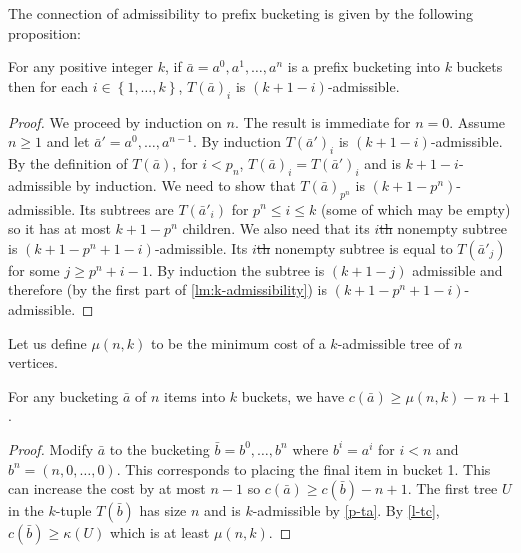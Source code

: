 \documentclass[unicode,review]{siamart1116}
\newcommand{\natInt}[2]{ \left\{ #1, \dotsc, #2 \right\} }
\numberwithin{theorem}{section}
\providecommand{\DIFadd}[1]{{\protect\color{blue}\uwave{#1}}} %
\providecommand{\DIFdel}[1]{{\protect\color{red}\sout{#1}}}                      %
\providecommand{\DIFaddbegin}{} %
\providecommand{\DIFaddend}{} %
\providecommand{\DIFdelbegin}{} %
\providecommand{\DIFdelend}{} %
\newcommand{\DIFscaledelfig}{0.5}
\newlength{\DIFdelgraphicswidth} %
\newlength{\DIFdelgraphicsheight} %
\newcommand{\DIFaddincludegraphics}[2][]{{\color{blue}\fbox{\DIFOincludegraphics[#1]{#2}}}} %
\newcommand{\DIFdelincludegraphics}[2][]{%
\sbox{\DIFdelgraphicsbox}{\DIFOincludegraphics[#1]{#2}}%
\settoboxwidth{\DIFdelgraphicswidth}{\DIFdelgraphicsbox} %
\settoboxtotalheight{\DIFdelgraphicsheight}{\DIFdelgraphicsbox} %
\scalebox{\DIFscaledelfig}{%
\parbox[b]{\DIFdelgraphicswidth}{\usebox{\DIFdelgraphicsbox}\\[-\baselineskip] \rule{\DIFdelgraphicswidth}{0em}}\llap{\resizebox{\DIFdelgraphicswidth}{\DIFdelgraphicsheight}{%
\setlength{\unitlength}{\DIFdelgraphicswidth}%
\begin{picture}(1,1)%
\thicklines\linethickness{2pt} %
{\color[rgb]{1,0,0}\put(0,0){\framebox(1,1){}}}%
{\color[rgb]{1,0,0}\put(0,0){\line( 1,1){1}}}%
{\color[rgb]{1,0,0}\put(0,1){\line(1,-1){1}}}%
\end{picture}%
}\hspace*{3pt}}} %
} %
\DeclareRobustCommand{\DIFaddbegin}{\DIFOaddbegin \let\includegraphics\DIFaddincludegraphics} %
\DeclareRobustCommand{\DIFaddend}{\DIFOaddend \let\includegraphics\DIFOincludegraphics} %
\DeclareRobustCommand{\DIFdelbegin}{\DIFOdelbegin \let\includegraphics\DIFdelincludegraphics} %
\DeclareRobustCommand{\DIFdelend}{\DIFOaddend \let\includegraphics\DIFOincludegraphics} %
\begin{document}
The connection of admissibility to prefix bucketing is given by the following proposition:

\begin{proposition}\label{p-ta}
For any positive integer $k$, if $\bar{a} = a^0,a^1,\dotsc,a^n$ is a prefix bucketing into $k$ buckets then
for each $i \in \natInt{1}{k}$, $T(\bar{a})_i$ is $(k+1-i)$-admissible.
\end{proposition}

\begin{proof}
We proceed by induction on $n$.  The result is immediate for $n=0$.   Assume $n\geq 1$
and let $\bar{a}'=a^0,\ldots,a^{n-1}$.  By induction $T(\bar{a}')_i$ is $(k+1-i)$-admissible.
By the definition of $T(\bar{a})$, for $i <p_n$, $T(\bar{a})_i=T(\bar{a}')_i$ and is
 $k+1-i$-admissible by induction.  We need to show that $T(\bar{a})_{p^n}$ is
$(k+1-p^n)$-admissible.   Its subtrees are $T(\bar{a}'_i)$ for $p^n \leq i \leq k$ (some of which may be empty)
so it has at most $k+1-p^n$ children. We also need that its $i$\DIFdelbegin \DIFdel{th }\DIFdelend \DIFaddbegin \DIFadd{-th }\DIFaddend nonempty subtree is $(k+1-p^n + 1 -i)$-admissible. 
Its $i$\DIFdelbegin \DIFdel{th }\DIFdelend \DIFaddbegin \DIFadd{-th }\DIFaddend nonempty subtree is equal to $T(\bar{a}'_j)$ for
some $j \geq p^n+i-1$. By induction the subtree is $(k+1-j)$ admissible and therefore (by the first part of \cref{lm:k-admissibility}) is $(k+1-p^n +1 - i)$-admissible. 
\end{proof}

Let us define $\mu(n,k)$ to be the minimum cost of a $k$-admissible tree of $n$ vertices.

\begin{proposition}
\label{prop:mu}
For any bucketing $\bar{a}$ of $n$ items into $k$ buckets, we have $c(\bar{a}) \geq \mu(n,k) - n+1$.
\end{proposition}


\begin{proof}
Modify $\bar{a}$ to the bucketing $\bar{b}=b^0,\ldots,b^n$ where $b^i=a^i$
for $i<n$ and $b^n=(n,0,\ldots,0)$.  This corresponds to placing the final item in bucket 1.
This can increase the cost by at most $n-1$ so
 $c(\bar{a}) \geq c(\bar{b}) - n+1$.  The first tree $U$ in the  $k$-tuple  $T(\bar{b})$ has  size $n$ and is $k$-admissible
by \cref{p-ta}.  By \cref{l-tc}, $c(\bar{b}) \geq \kappa(U)$ which
is at least $\mu(n,k)$.  
\end{proof}
\end{document}
